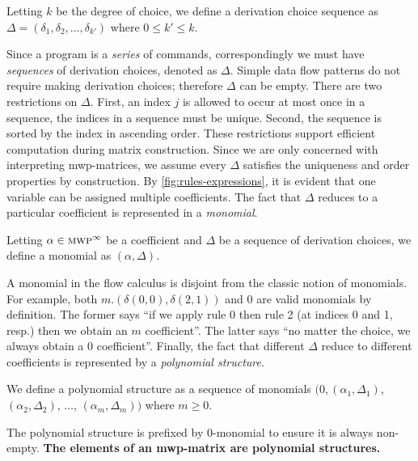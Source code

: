 \begin{definition}
    Letting \(k\) be the degree of choice,
    we define a derivation choice sequence as \(\Delta = (\delta_1, \delta_2, \dots, \delta_{k'})\)
    where \(0 \leq k' \leq k \). %
\end{definition}
Since a program is a \emph{series} of commands, correspondingly we must have \emph{sequences} of derivation choices, denoted as \(\Delta\).
Simple data flow patterns do not require making derivation choices;
therefore \(\Delta\) can be empty.
There are two restrictions on \(\Delta\).
First, an index \(j\) is allowed to occur at most once in a sequence, \ie the indices in a sequence must be unique.
Second, the sequence is sorted by the index in ascending order.
These restrictions support efficient computation during matrix construction.
Since we are only concerned with {interpreting} mwp-matrices, we assume every \(\Delta\) satisfies the uniqueness and order properties by construction.
By \autoref{fig:rules-expressions}, it is evident that one variable can be assigned multiple coefficients.
The fact that \(\Delta\) reduces to a particular coefficient is represented in a \emph{monomial}.

\begin{definition}[Monomial]\label{def:mono}
Letting \(\alpha \in \text{\textsc{mwp}}^\infty\) be a coefficient and \(\Delta\) be a sequence of derivation choices,
we define a monomial as \((\alpha, \Delta)\).
\end{definition}

\noindent
A monomial in the flow calculus is disjoint from the classic notion of monomials.
For example, both \(m.(\delta(0,0),\delta(2,1))\) and \(0\) are valid monomials by definition.
The former says \enquote{if we apply rule 0 then rule 2 (at indices 0 and 1, resp.) then we obtain an \(m\) coefficient}.
The latter says \enquote{no matter the choice, we always obtain a \(0\) coefficient}.
Finally, the fact that {different \(\Delta\)} reduce to {different coefficients} is represented by a \emph{polynomial structure}.

\begin{definition}
    We define a polynomial structure as a sequence of monomials
    \(\big(0,(\alpha_1,\Delta_1)\), \((\alpha_2,\Delta_2)\), \(\dots\), \((\alpha_m, \Delta_m)\big)\) where \(m \geq 0\).
\end{definition}

\noindent The polynomial structure is prefixed by \(0\)-monomial to ensure it is always non-empty.
\textbf{The elements of an mwp-matrix are polynomial structures.}

